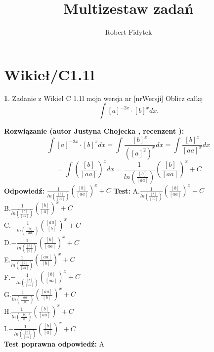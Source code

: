 \documentclass[12pt, a4paper]{article}
\title{Multizestaw zadań}
\author{Robert Fidytek}
\date{}
\theoremstyle{definition} %
\newtheorem{zad}{}
\newcommand{\kategoria}[1]{\section{#1}} %
\newcommand{\zadStart}[1]{\begin{zad}#1\newline} %
\newcommand{\zadStop}{\end{zad}}   %
\newcommand{\rozwStart}[2]{\noindent \textbf{Rozwiązanie (autor #1 , recenzent #2): }\newline} %
\newcommand{\rozwStop}{\newline}                                            %
\newcommand{\odpStart}{\noindent \textbf{Odpowiedź:}\newline}    %
\newcommand{\odpStop}{\newline}                                             %
\newcommand{\testStart}{\noindent \textbf{Test:}\newline} %
\newcommand{\testStop}{\newline} %
\newcommand{\kluczStart}{\noindent \textbf{Test poprawna odpowiedź:}\newline} %
\newcommand{\kluczStop}{\newline} %
\begin{document}
\maketitle
\kategoria{Wikieł/C1.1l}
\zadStart{Zadanie z Wikieł C 1.1l moja wersja nr [nrWersji]}
Oblicz całkę $$\int [a]^{-2x}\cdot [b]^{x} dx.$$
\zadStop
\rozwStart{Justyna Chojecka}{}
$$\int [a]^{-2x}\cdot [b]^{x} dx=\int \frac{[b]^{x}}{([a]^{2})^{x}}dx=\int \frac{[b]^{x}}{[aa]^{x}}dx$$$$=\int \left(\frac{[b]}{[aa]}\right)^{x}dx=\frac{1}{ln\left(\frac{[b]}{[aa]}\right)}\left(\frac{[b]}{[aa]}\right)^{x}+C$$
\rozwStop
\odpStart
$\frac{1}{ln\left(\frac{[b]}{[aa]}\right)}\left(\frac{[b]}{[aa]}\right)^{x}+C$
\odpStop
\testStart
A.$\frac{1}{ln\left(\frac{[b]}{[aa]}\right)}\left(\frac{[b]}{[aa]}\right)^{x}+C$\\
B.$\frac{1}{ln\left(\frac{[b]}{[aa]}\right)}\left(\frac{[b]}{[a]}\right)^{x}+C$\\
C.$-\frac{1}{ln\left(\frac{[b]}{[aa]}\right)}\left(\frac{[aa]}{[b]}\right)^{x}+C$\\
D.$-\frac{1}{ln\left(\frac{[b]}{[a]}\right)}\left(\frac{[b]}{[aa]}\right)^{x}+C$\\
E.$\frac{1}{ln\left(\frac{[b]}{[aa]}\right)}\left(\frac{[aa]}{[b]}\right)^{x}+C$\\
F.$-\frac{1}{ln\left(\frac{[b]}{[aa]}\right)}\left(\frac{[b]}{[aa]}\right)^{x}+C$\\
G.$\frac{1}{ln\left(\frac{[aa]}{[b]}\right)}\left(\frac{[aa]}{[b]}\right)^{x}+C$\\
H.$\frac{1}{ln\left(\frac{[b]}{[a]}\right)}\left(\frac{[b]}{[aa]}\right)^{x}+C$\\
I.$-\frac{1}{ln\left(\frac{[b]}{[aa]}\right)}\left(\frac{[b]}{[a]}\right)^{x}+C$\\
\testStop
\kluczStart
A
\kluczStop
\end{document}
